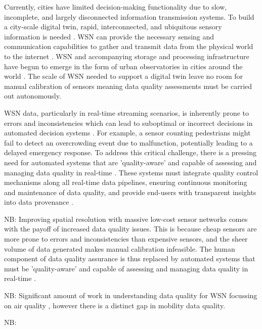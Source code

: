 Currently, cities have limited decision-making functionality due to slow, incomplete, and largely disconnected information transmission systems. To build a city-scale digital twin, rapid, interconnected, and ubiquitous sensory information is needed \citep{mohammadiSmartCityDigital2017}. WSN can provide the necessary sensing and communication capabilities to gather and transmit data from the physical world to the internet \citep{maOnlineMiningSensor2004}. WSN and accompanying storage and processing infrastructure have begun to emerge in the form of urban observatories in cities around the world \citep{smithBuildingUrbanObservatory2019,rusliReviewWorldwideUrban2023}. The scale of WSN needed to support a digital twin leave no room for manual calibration of sensors meaning data quality assessments must be carried out autonomously.

WSN data, particularly in real-time streaming scenarios, is inherently prone to errors and inconsistencies which can lead to suboptimal or incorrect decisions in automated decision systems \citep{kleinRepresentingDataQuality2009}. For example, a sensor counting pedestrians might fail to detect an overcrowding event due to malfunction, potentially leading to a delayed emergency response. To address this critical challenge, there is a pressing need for automated systems that are 'quality-aware' and capable of assessing and managing data quality in real-time \citep{bisdikianLetterSoupQuality2009,karkouchDataQualityInternet2016}. These systems must integrate quality control mechanisms along all real-time data pipelines, ensuring continuous monitoring and maintenance of data quality, and provide end-users with transparent insights into data provenance \citep{elkhodrDataProvenanceTrust2020}.

NB: Improving spatial resolution with massive low-cost sensor networks comes with the payoff of increased data quality issues. This is because cheap sensors are more prone to errors and inconsistencies than expensive sensors, and the sheer volume of data generated makes manual calibration infeasible. The human component of data quality assurance is thus replaced by automated systems that must be 'quality-aware' and capable of assessing and managing data quality in real-time \citep{buelvasDataQualityIoTBased2023}.

NB: Significant amount of work in understanding data quality for WSN focussing on air quality \citep{vanzoestDataQualityEvaluation2021}, however there is a distinct gap in mobility data quality.

NB: \cite{sarrabDevelopmentIoTBased2020}